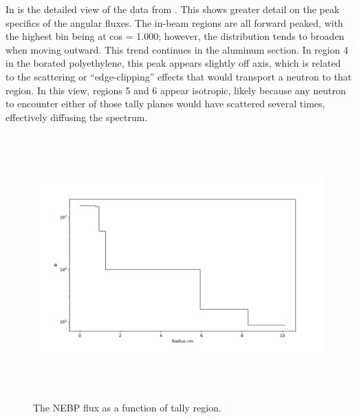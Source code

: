 In  is the detailed view of the data from .
This shows greater detail on the peak specifics of the angular fluxes.
The in-beam regions are all forward peaked, with the highest bin being at cos = 1.000; however, the distribution tends to broaden when moving outward.
This trend continues in the aluminum section.
In region 4 in the borated polyethylene, this peak appears slightly off axis, which is related to the scattering or ``edge-clipping'' effects that would transport a neutron to that region.
In this view, regions 5 and 6 appear isotropic, likely because any neutron to encounter either of those tally planes would have scattered several times, effectively diffusing the spectrum.


\begin{figure}[htb]
\centering
\includegraphics[height=4in]{tex/figures/flux_rad.png}
\caption[Regional Flux]{The NEBP flux as a function of tally region.}
\label{fig:flux_rad}
\end{figure}

